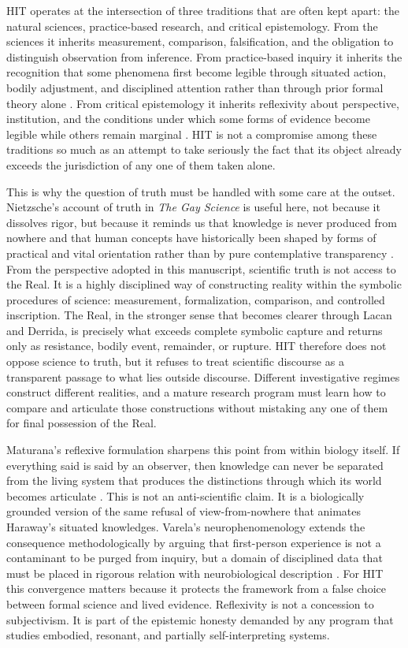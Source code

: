 HIT operates at the intersection of three traditions that are often kept apart: the natural sciences, practice-based research, and critical epistemology. From the sciences it inherits measurement, comparison, falsification, and the obligation to distinguish observation from inference. From practice-based inquiry it inherits the recognition that some phenomena first become legible through situated action, bodily adjustment, and disciplined attention rather than through prior formal theory alone \parencite{borgdorff_2012, smith_dean_2009}. From critical epistemology it inherits reflexivity about perspective, institution, and the conditions under which some forms of evidence become legible while others remain marginal \parencite{haraway_1988, harding_1991}. HIT is not a compromise among these traditions so much as an attempt to take seriously the fact that its object already exceeds the jurisdiction of any one of them taken alone.

This is why the question of truth must be handled with some care at the outset. Nietzsche's account of truth in \emph{The Gay Science} is useful here, not because it dissolves rigor, but because it reminds us that knowledge is never produced from nowhere and that human concepts have historically been shaped by forms of practical and vital orientation rather than by pure contemplative transparency \parencite{nietzsche_1882}. From the perspective adopted in this manuscript, scientific truth is not access to the Real. It is a highly disciplined way of constructing reality within the symbolic procedures of science: measurement, formalization, comparison, and controlled inscription. The Real, in the stronger sense that becomes clearer through Lacan and Derrida, is precisely what exceeds complete symbolic capture and returns only as resistance, bodily event, remainder, or rupture. HIT therefore does not oppose science to truth, but it refuses to treat scientific discourse as a transparent passage to what lies outside discourse. Different investigative regimes construct different realities, and a mature research program must learn how to compare and articulate those constructions without mistaking any one of them for final possession of the Real.

Maturana's reflexive formulation sharpens this point from within biology itself. If everything said is said by an observer, then knowledge can never be separated from the living system that produces the distinctions through which its world becomes articulate \parencite{maturana_1970, maturana_1988}. This is not an anti-scientific claim. It is a biologically grounded version of the same refusal of view-from-nowhere that animates Haraway's situated knowledges. Varela's neurophenomenology extends the consequence methodologically by arguing that first-person experience is not a contaminant to be purged from inquiry, but a domain of disciplined data that must be placed in rigorous relation with neurobiological description \parencite{varela_1996_neuro}. For HIT this convergence matters because it protects the framework from a false choice between formal science and lived evidence. Reflexivity is not a concession to subjectivism. It is part of the epistemic honesty demanded by any program that studies embodied, resonant, and partially self-interpreting systems.


